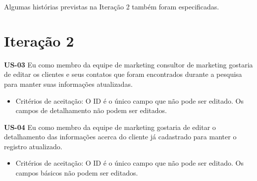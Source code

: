 Algumas histórias previstas na Iteração 2 também foram especificadas.
\section{Iteração 2}

\textbf{US-03} Eu como membro da equipe de marketing consultor de marketing gostaria de editar os clientes e seus contatos que foram encontrados durante a pesquisa para manter suas informações atualizadas.

\begin{itemize}
  \item Critérios de aceitação:
\subitem O ID é o único campo que não pode ser editado.
\subitem Os campos de detalhamento não podem ser editados.
 
\end{itemize}


\textbf{US-04} Eu como membro da equipe de marketing gostaria de editar o detalhamento das informações acerca do cliente já cadastrado para manter o registro atualizado.
\begin{itemize}
\item Critérios de aceitação:
\subitem O ID é o único campo que não pode ser editado.
\subitem Os campos básicos não podem ser editados.

\end{itemize}




